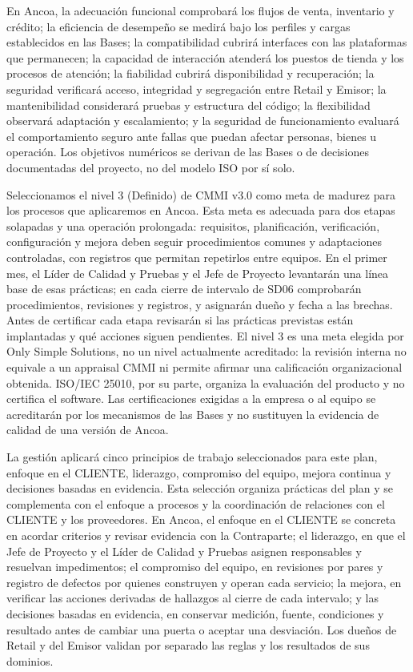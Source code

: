 \documentclass[11pt]{article}
\begin{document}
En Ancoa, la adecuación funcional comprobará los flujos de venta, inventario y crédito; la eficiencia de desempeño se medirá bajo los perfiles y cargas establecidos en las Bases; la compatibilidad cubrirá interfaces con las plataformas que permanecen; la capacidad de interacción atenderá los puestos de tienda y los procesos de atención; la fiabilidad cubrirá disponibilidad y recuperación; la seguridad verificará acceso, integridad y segregación entre Retail y Emisor; la mantenibilidad considerará pruebas y estructura del código; la flexibilidad observará adaptación y escalamiento; y la seguridad de funcionamiento evaluará el comportamiento seguro ante fallas que puedan afectar personas, bienes u operación. Los objetivos numéricos se derivan de las Bases o de decisiones documentadas del proyecto, no del modelo ISO por sí solo.

Seleccionamos el nivel 3 (Definido) de CMMI v3.0 como meta de madurez para los procesos que aplicaremos en Ancoa. Esta meta es adecuada para dos etapas solapadas y una operación prolongada: requisitos, planificación, verificación, configuración y mejora deben seguir procedimientos comunes y adaptaciones controladas, con registros que permitan repetirlos entre equipos. En el primer mes, el Líder de Calidad y Pruebas y el Jefe de Proyecto levantarán una línea base de esas prácticas; en cada cierre de intervalo de SD06 comprobarán procedimientos, revisiones y registros, y asignarán dueño y fecha a las brechas. Antes de certificar cada etapa revisarán si las prácticas previstas están implantadas y qué acciones siguen pendientes. El nivel 3 es una meta elegida por Only Simple Solutions, no un nivel actualmente acreditado: la revisión interna no equivale a un appraisal CMMI ni permite afirmar una calificación organizacional obtenida. ISO/IEC 25010, por su parte, organiza la evaluación del producto y no certifica el software. Las certificaciones exigidas a la empresa o al equipo se acreditarán por los mecanismos de las Bases y no sustituyen la evidencia de calidad de una versión de Ancoa.

La gestión aplicará cinco principios de trabajo seleccionados para este plan, enfoque en el CLIENTE, liderazgo, compromiso del equipo, mejora continua y decisiones basadas en evidencia. Esta selección organiza prácticas del plan y se complementa con el enfoque a procesos y la coordinación de relaciones con el CLIENTE y los proveedores. En Ancoa, el enfoque en el CLIENTE se concreta en acordar criterios y revisar evidencia con la Contraparte; el liderazgo, en que el Jefe de Proyecto y el Líder de Calidad y Pruebas asignen responsables y resuelvan impedimentos; el compromiso del equipo, en revisiones por pares y registro de defectos por quienes construyen y operan cada servicio; la mejora, en verificar las acciones derivadas de hallazgos al cierre de cada intervalo; y las decisiones basadas en evidencia, en conservar medición, fuente, condiciones y resultado antes de cambiar una puerta o aceptar una desviación. Los dueños de Retail y del Emisor validan por separado las reglas y los resultados de sus dominios.
\end{document}
